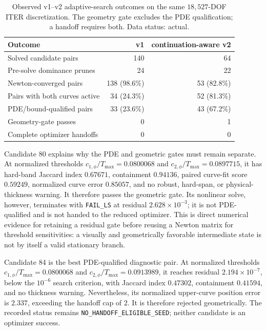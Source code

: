 \begin{table}[tbp]
\centering
\caption{Observed v1--v2 adaptive-search outcomes on the same
\(18{,}527\)-DOF ITER discretization.  The geometry gate excludes the PDE
qualification; a handoff requires both.  Data status: actual.}
\label{tab:iter-adaptive-v1-v2}
\begin{tabular}{lrr}
\toprule
Outcome & v1 & continuation-aware v2 \\
\midrule
Solved candidate pairs & 140 & 64 \\
Pre-solve dominance prunes & 24 & 22 \\
Newton-converged pairs & 138 (98.6\%) & 53 (82.8\%) \\
Pairs with both curves active & 34 (24.3\%) & 52 (81.3\%) \\
PDE/bound-qualified pairs & 33 (23.6\%) & 43 (67.2\%) \\
Geometry-gate passes & 0 & 1 \\
Complete optimizer handoffs & 0 & 0 \\
\bottomrule
\end{tabular}
\end{table}

Candidate 80 explains why the PDE and geometric gates must remain separate.
At normalized thresholds \(c_{1,\phi}/T_{\max}=0.0800068\) and
\(c_{2,\phi}/T_{\max}=0.0897715\), it has hard-band Jaccard index \(0.67671\),
containment \(0.94136\), paired
curve-fit score \(0.59249\), normalized curve error \(0.85057\), and no robust,
hard-span, or physical-thickness warning.  It therefore passes the geometric
gate.  Its nonlinear solve, however, terminates with
\texttt{FAIL\_LS} at residual \(2.628\times10^{-3}\); it is not PDE-qualified
and is not handed to the reduced optimizer.  This is direct numerical evidence
for retaining a residual gate before reusing a Newton matrix for threshold
sensitivities: a visually and geometrically favorable intermediate state is
not by itself a valid stationary branch.

Candidate 84 is the best PDE-qualified diagnostic pair.  At normalized
thresholds \(c_{1,\phi}/T_{\max}=0.0800068\) and
\(c_{2,\phi}/T_{\max}=0.0913989\), it reaches residual
\(2.194\times10^{-7}\), below the \(10^{-6}\) search
criterion, with Jaccard index \(0.47302\), containment \(0.41594\), and no
thickness warning.  Nevertheless, its normalized upper-curve position error
is \(2.337\), exceeding the handoff cap of \(2\).  It is therefore rejected
geometrically.  The recorded status remains
\texttt{NO\_HANDOFF\_ELIGIBLE\_SEED}; neither candidate is an optimizer
success.

